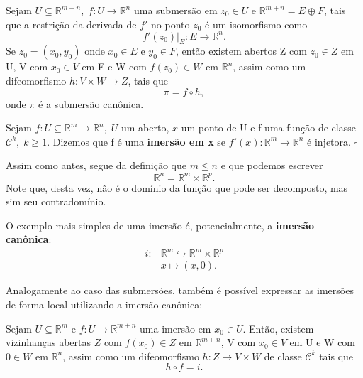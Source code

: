 \documentclass[../differential_topology.tex]{subfiles}
\begin{document}
\hypertarget{local_submersions}{
	\begin{theorem*}
		Sejam \(U\subseteq \mathbb{R}^{m+n},\; f:U\rightarrow \mathbb{R}^{n}\) uma submersão em \(z_{0}\in U\) e \(\mathbb{R}^{m+n} = E \oplus F\), tais que a restrição da derivada de \(f'\) no ponto \(z_{0}\) é um isomorfismo como
		\[
			f'(z_{0})|_{E}:E\rightarrow \mathbb{R}^{n}.
		\]
		Se \(z_{0} = (x_{0}, y_{0})\) onde \(x_{0}\in E\) e \(y_{0}\in F\), então existem abertos Z com \(z_{0}\in Z\) em U, V com \(x_{0}\in V\) em E e W com \(f(z_{0})\in W\) em \(\mathbb{R}^{n}\), assim como um difeomorfismo \(h:V\times W\rightarrow Z\), tais que
		\[
			\pi = f\circ h,
		\]
		onde \(\pi \) é a submersão canônica.
	\end{theorem*}
}
\begin{def*}
	Sejam \(f:U\subseteq \mathbb{R}^{m}\rightarrow \mathbb{R}^{n},\; U\) um aberto, \(x\) um ponto de U e f uma função de classe \(\mathcal{C}^{k},\; k \geq 1.\) Dizemos que f é uma \textbf{imersão em x} se \(f'(x):\mathbb{R}^{m}\rightarrow \mathbb{R}^{n}\) é injetora. \(\square\)
\end{def*}
Assim como antes, segue da definição que \(m\leq n\) e que podemos escrever
\[
	\mathbb{R}^{n} = \mathbb{R}^{m}\times \mathbb{R}^{p}.
\]
Note que, desta vez, não é o domínio da função que pode ser decomposto, mas sim seu contradomínio.

\begin{example}
	O exemplo mais simples de uma imersão é, potencialmente, a \textbf{imersão canônica}:
	\begin{align*}
		i: & \mathbb{R}^{m}\hookrightarrow \mathbb{R}^{m}\times \mathbb{R}^{p} \\
		   & x\longmapsto (x, 0).
	\end{align*}
\end{example}
Analogamente ao caso das submersões, também é possível expressar as imersões de forma local utilizando a imersão canônica:

\hypertarget{local_imersions}{
	\begin{theorem*}
		Sejam \(U\subseteq \mathbb{R}^{m}\) e \(f:U\rightarrow \mathbb{R}^{m+n}\) uma imersão em \(x_{0}\in U\). Então, existem vizinhanças abertas \(Z\) com \(f(x_{0})\in Z\) em \(\mathbb{R}^{m+n}\), V com \(x_{0}\in V\) em U e W com \(0\in W\) em \(\mathbb{R}^{n}\), assim como um difeomorfismo \(h:Z\rightarrow V\times W\) de classe \(\mathcal{C}^{k}\) tais que
		\[
			h\circ f = i.
		\]
	\end{theorem*}
}
\end{document}

